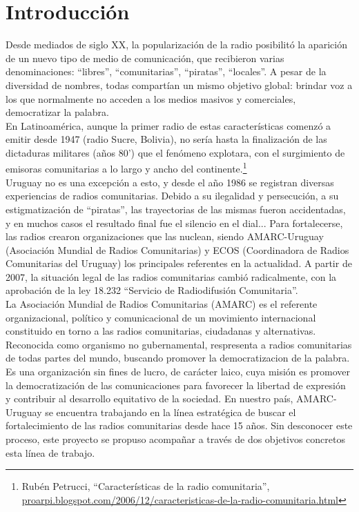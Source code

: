 \chapter{Introducción}

Desde mediados de siglo XX, la popularización de la radio posibilitó la aparición de un nuevo tipo de medio de comunicación, que recibieron varias denominaciones: ``libres'', ``comunitarias'', ``piratas'', ``locales''. A pesar de la diversidad de nombres, todas compartían un mismo objetivo global: brindar voz a los que normalmente no acceden a los medios masivos y comerciales, democratizar la palabra.\\

En Latinoamérica, aunque la primer radio de estas características comenzó a emitir desde 1947 (radio Sucre, Bolivia), no sería hasta la finalización de las dictaduras militares (años 80') que el fenómeno explotara, con el surgimiento de emisoras comunitarias a lo largo y ancho del continente.\footnote{Rubén Petrucci, ``Características de la radio comunitaria'', \href{http://proarpi.blogspot.com/2006/12/caracteristicas-de-la-radio-comunitaria.html}{proarpi.blogspot.com/2006/12/caracteristicas-de-la-radio-comunitaria.html}}
\\

Uruguay no es una excepción a esto, y desde el año 1986 se registran diversas experiencias de radios comunitarias. Debido a su ilegalidad y persecución, a su estigmatización de ``piratas'', las trayectorias de las mismas fueron accidentadas, y en muchos casos el resultado final fue el silencio en el dial... Para fortalecerse, las radios crearon organizaciones que las nuclean, siendo AMARC-Uruguay (Asociación Mundial de Radios Comunitarias) y ECOS (Coordinadora de Radios Comunitarias del Uruguay) los principales referentes en la actualidad. A partir de 2007, la situación legal de las radios comunitarias cambió radicalmente, con la aprobación de la ley 18.232 ``Servicio de Radiodifusión Comunitaria''.\\

La Asociación Mundial de Radios Comunitarias (AMARC) es el referente organizacional, político y comunicacional de un movimiento internacional constituido en torno a las radios comunitarias, ciudadanas y alternativas. Reconocida como organismo no gubernamental, respresenta a radios comunitarias de todas partes del mundo, buscando promover la democratizacion de la palabra. Es una organización sin fines de lucro, de carácter laico, cuya misión es promover la democratización de las comunicaciones para favorecer la libertad de expresión y contribuir al desarrollo equitativo de la sociedad. En nuestro país, AMARC-Uruguay se encuentra trabajando en la línea estratégica de buscar el fortalecimiento de las radios comunitarias desde hace 15 años. Sin desconocer este proceso, este proyecto se propuso acompañar a través de dos objetivos concretos esta línea de trabajo.\\

